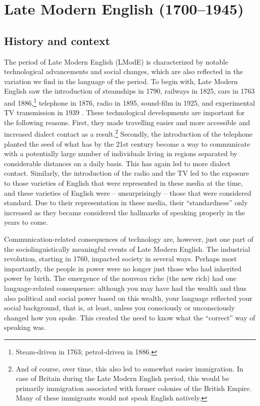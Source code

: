 \chapter{Late Modern English (1700--1945)}\label{LModE}

\section{History and context}
The period of Late Modern English (LModE) is characterized by notable technological advancements and social changes, which are also reflected in the variation we find in the language of the period. To begin with, Late Modern English saw the introduction of steamships in 1790, railways in 1825, cars in 1763 and 1886,\footnote{Steam-driven in 1763; petrol-driven in 1886.} telephone in 1876, radio in 1895, sound-film in 1925, and experimental TV transmission in 1939 \citep[75]{Strang1970}. These technological developments are important for the following reasons. First, they made travelling easier and more accessible and increased dialect contact as a result.\footnote{And of course, over time, this also led to somewhat easier immigration. In case of Britain during the Late Modern English period, this would be primarily immigration associated with former colonies of the British Empire. Many of these immigrants would not speak English natively.} Secondly, the introduction of the telephone planted the seed of what has by the 21st century become a way to communicate with a potentially large number of individuals living in regions separated by considerable distances on a daily basis. This has again led to more dialect contact. Similarly, the introduction of the radio and the TV led to the exposure to those varieties of English that were represented in these media at the time, and these varieties of English were -- unsurprisingly -- those that were considered standard. Due to their representation in these media, their ``standardness'' only increased as they became considered the hallmarks of speaking properly in the years to come. 

Communication-related consequences of technology are, however, just one part of the sociolinguistically meaningful events of Late Modern English. The industrial revolution, starting in 1760, impacted society in several ways. Perhaps most importantly, the people in power were no longer just those who had inherited power by birth. The emergence of the nouveau riche (the new rich) had one language-related consequence: although you may have had the wealth and thus also political and social power based on this wealth, your language reflected your social background, that is, at least, unless you consciously or unconsciously changed how you spoke. This created the need to know what the ``correct'' way of speaking was.

